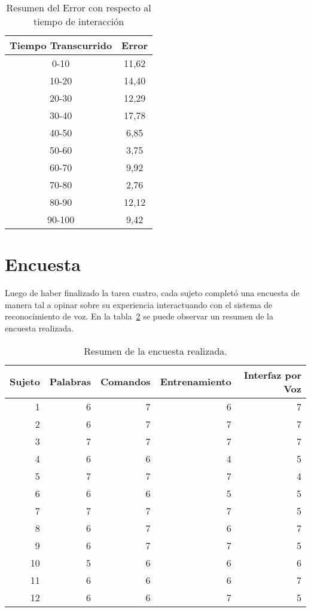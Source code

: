 \begin{table}[H]
\centering
\footnotesize
\begin{tabular}{|c|c|}
\hline
    Tiempo Transcurrido & Error \\
    \hline
0-10  &  11,62 \\
10-20 &  14,40 \\
20-30 &  12,29 \\
30-40 &  17,78 \\
40-50 &  6,85 \\
50-60 &  3,75 \\
60-70 &  9,92 \\
70-80 &  2,76 \\
80-90 &  12,12 \\
90-100 & 9,42 \\
    \hline
\end{tabular}
\caption{Resumen del Error con respecto al tiempo de interacci\'on}
\label{sec:error-tiempo}
\end{table}

\section{Encuesta}

Luego de haber finalizado la tarea cuatro, cada sujeto complet\'o una encuesta de manera tal a
opinar sobre su experiencia interactuando con el sistema de reconocimiento de voz. En la tabla~\ref{sec:tabla-encuesta}
se puede observar un resumen de la encuesta realizada.


\begin{table}[H] 
\centering
\footnotesize
\begin{tabular}{|r|r|r|r|r|}
\hline
    Sujeto & Palabras & Comandos & Entrenamiento & Interfaz por Voz \\
    \hline
    1 & 6 & 7 & 6 & 7 \\
    2 & 6 & 7 & 7 & 7 \\
    3 & 7 & 7 & 7 & 7 \\
    4 & 6 & 6 & 4 & 5 \\
    5 & 7 & 7 & 7 & 4 \\
    6 & 6 & 6 & 5 & 5 \\
    7 & 7 & 7 & 7 & 5 \\
    8 & 6 & 7 & 6 & 7  \\
    9 & 6 & 7 & 7 & 5  \\
    10 & 5 & 6 & 6 & 6  \\
    11 & 6 & 6 & 6 & 7  \\
    12 & 6 & 6 & 7 & 5  \\
\hline
\end{tabular}
\caption{Resumen de la encuesta realizada.}
\label{sec:tabla-encuesta}
\end{table}

